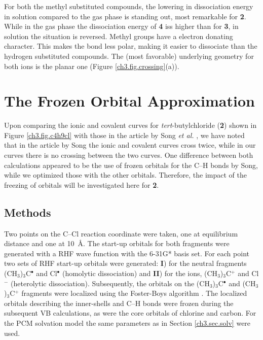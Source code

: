 For both the methyl substituted compounds, the lowering in dissociation energy in solution compared to the gas phase is standing out, most remarkable for \textbf{2}. While in the gas phase the dissociation energy of \textbf{4} iss higher than for \textbf{3}, in solution the situation is reversed. Methyl groups have a electron donating character. This makes the bond less polar, making it easier to dissociate than the hydrogen substituted compounds. The (most favorable) underlying geometry for both ions is the planar one (Figure \ref{ch3.fig.crossing}(a)).

\section{The Frozen Orbital Approximation}

Upon comparing the ionic and covalent curves for \textit{tert}-butylchloride (\textbf{2}) shown in Figure \ref{ch3.fig.c4h9cl} with those in the article by Song \textit{et al.} \cite{song}, we have noted that in the article by Song the ionic and covalent curves cross twice, while in our curves there is no crossing between the two curves. One difference between both calculations appeared to be the use of frozen orbitals for the C--H bonds by Song, while we optimized those with the other orbitals. Therefore, the impact of the freezing of orbitals will be investigated here for \textbf{2}.

\subsection{Methods}

Two points on the C--Cl reaction coordinate were taken, one at equilibrium distance and one at \mbox{10 \AA}. The start-up orbitals for both fragments were generated with a RHF wave function with the 6-31G* basis set. For each point two sets of RHF start-up orbitals were generated: \textbf{I}) for the neutral fragments (CH$_3$)$_3$C$^\bullet$ and Cl$^\bullet$ (homolytic dissociation) and \textbf{II}) for the ions, (CH$_3$)$_3$C$^{+}$ and Cl$^{-}$ (heterolytic dissociation). Subsequently, the orbitals on the (CH$_3$)$_3$C$^\bullet$ and (CH$_3$)$_3$C$^{+}$ fragments were localized using the Foster-Boys algorithm \cite{foster}. The localized orbitals describing the inner-shells and C--H bonds were frozen during the subsequent VB calculations, as were the core orbitals of chlorine and carbon. For the PCM solvation model the same parameters as in Section \ref{ch3.sec.solv} were used.

